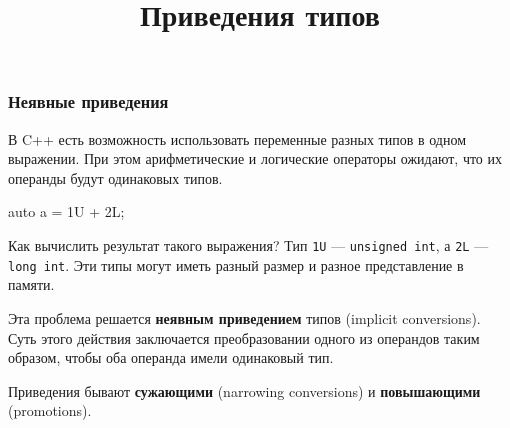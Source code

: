 \documentclass[compress, 8pt]{beamer}
\title{Приведения типов}
\begin{document}
\frame[plain]{\titlepage}

\begin{frame}[fragile]

    \frametitle{Неявные приведения}

    \hfill\break
    В C++ есть возможность использовать переменные разных типов в одном выражении.
    При этом арифметические и логические операторы ожидают, что их операнды будут
    одинаковых типов.

    \begin{myinplacelisting}[minted language=cpp]
auto a = 1U + 2L;
    \end{myinplacelisting}

    Как вычислить результат такого выражения?
    Тип \verb|1U| --- \verb|unsigned int|\footnotemark{}, а \verb|2L| ---
    \verb|long int|.
    Эти типы могут иметь разный размер и разное представление в памяти.


    \hfill\break
    Эта проблема решается \textbf{неявным приведением}\footnotemark{} типов
    (implicit conversions).
    Суть этого действия заключается преобразовании одного из операндов таким образом,
    чтобы оба операнда имели одинаковый тип.

    \hfill\break
    Приведения бывают \textbf{сужающими} (narrowing conversions) и \textbf{повышающими}
    (promotions).


\end{frame}
\end{document}
